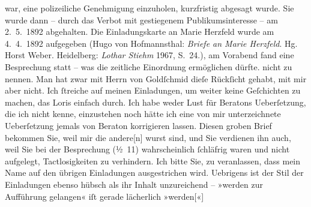 \begin{ledgroupsized}[t]{13cm}
{{{                        war, eine polizeiliche Genehmigung einzuholen, kurzfristig abgesagt wurde.
                        Sie wurde dann – durch das Verbot mit gestiegenem Publikumsinteresse – am
                            2. 5. 1892 abgehalten. Die Einladungskarte an Marie Herzfeld wurde am
                            4. 4. 1892 aufgegeben (Hugo von Hofmannsthal: \emph{Briefe an Marie Herzfeld}. Hg. Horst Weber.
                            Heidelberg: \emph{Lothar Stiehm}{ }1967, S. 24.), am Vorabend fand eine Besprechung
                        statt – was die zeitliche Einordnung ermöglichen dürfte.}}}\label{K_L00092_1h} nicht zu
                    nennen. Man hat zwar mit Herrn von
                        Goldſchmid dieſe Rückſicht gehabt, mit mir aber nicht. Ich ſtreiche
                    auf meinen Einladungen, um weiter keine Geſchichten zu machen, das Loris einfach
                    durch. Ich habe {\pb}weder Lust für Beratons Ueberſetzung, die ich nicht
                    kenne, einzustehen noch hätte ich eine von mir unterzeichnete Ueberſetzung jemals
                    von Beraton korrigieren lassen. Diesen
                    groben Brief bekommen Sie, weil mir die andere{[}n{]} wurst sind, und Sie verdienen
                    ihn auch, weil Sie bei der Besprechung (½ 11) wahrscheinlich
                    ſchläfrig waren und nicht aufgelegt, Tactlosigkeiten zu verhindern.\pend
           \pstart
           Ich bitte
                    Sie, zu veranlassen, dass mein Name auf den übrigen Einladungen ausgestrichen
                    wird. Uebrigens ist der Stil der Einladungen ebenso hübsch als ihr Inhalt
                    unzureichend – »werden zur Aufführung gelangen« iſt gerade lächerlich »werden{[}«{]}

\end{ledgroupsized}
